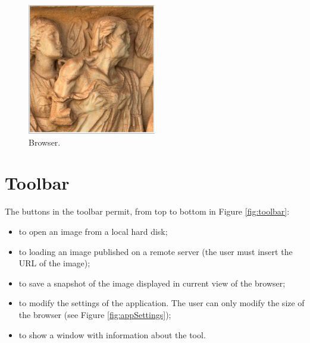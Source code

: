 \documentclass[oneside, 11pt]{book}
\begin{document}
\begin{figure}[htbp!]
  \centering
  \includegraphics[width=0.5\textwidth]{browser}
  \caption{Browser.}
  \label{fig:browser}
\end{figure}

\section{Toolbar}
The buttons in the toolbar permit, from top to bottom in Figure \ref{fig:toolbar}:
\begin{itemize}
\item to open an image from a local hard disk;
\item to loading an image published on a remote server (the user must insert the URL of the image);
\item to save a snapshot of the image displayed in current view of the browser;
\item to modify the settings of the application. The user can only modify the size of the browser (see Figure \ref{fig:appSettings});
\item to show a window with information about the tool.
\end{itemize}
\end{document}
